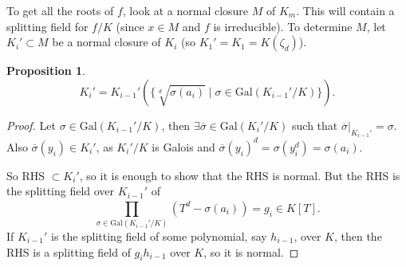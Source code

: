 \documentclass{article}
\theoremstyle{definition}
\newtheorem{prop}[theorem]{Proposition}
\begin{document}
To get all the roots of $f$, look at a normal closure $M$ of $K_m$. This will contain a splitting field for $f/K$ (since $x \in M$ and $f$ is irreducible). To determine $M$, let $K_i' \subset M$ be a normal closure of $K_i$ (so $K_1' = K_1 = K(\zeta_d)$).
\begin{prop}\label{16.1}
$$K_i' = K_{i-1}'(\{ \sqrt[d]{\sigma(a_i)} \mid \sigma \in \text{Gal}(K_{i-1}'/K) \}).$$
\end{prop}
\begin{proof}
    Let $\sigma \in \text{Gal}(K_{i-1}'/K)$, then $\exists \overline{\sigma} \in \text{Gal}(K_i'/K)$ such that $\overline{\sigma}|_{K_{i-1}'} = \sigma$. Also $\overline{\sigma}(y_i) \in K_i'$, as $K_i'/K$ is Galois and $\overline{\sigma}(y_i)^d = \sigma(y_i^d) = \sigma(a_i)$.
    \vspace{1mm}
    
    So RHS $\subset K_i'$, so it is enough to show that the RHS is normal. But the RHS is the splitting field over $K_{i-1}'$ of \[
    \prod_{\sigma \in \text{Gal}(K_{i-1}'/K)}^{}(T^d-\sigma(a_i)) = g_i \in K[T].
    \]
    If $K_{i-1}'$ is the splitting field of some polynomial, say $h_{i-1}$, over $K$, then the RHS is a splitting field of $g_i h_{i-1}$ over $K$, so it is normal.
\end{proof}

\end{document}
